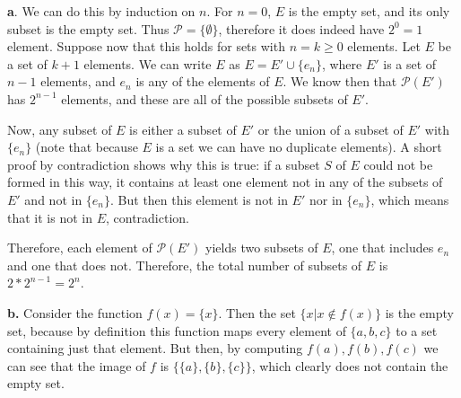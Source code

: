 \begin{solution}

    \textbf{a}. We can do this by induction on $n$. For $n = 0$, $E$ is the empty set, and its only subset is the empty set. Thus $\mathcal{P} = \{\emptyset\}$, therefore it does indeed have $2^0 = 1$ element. Suppose now that this holds for sets with $n = k \geq 0$ elements. Let $E$ be a set of $k+1$ elements. We can write $E$ as $E = E' \cup \{e_n\}$, where $E'$ is a set of $n-1$ elements, and $e_n$ is any of the elements of $E$. We know then that $\mathcal{P}(E')$ has $2^{n-1}$ elements, and these are all of the possible subsets of $E'$. 
    
    Now, any subset of $E$ is either a subset of $E'$ or the union of a subset of $E'$ with $\{e_n\}$ (note that because $E$ is a set we can have no duplicate elements). A short proof by contradiction shows why this is true: if a subset $S$ of $E$ could not be formed in this way, it contains at least one element not in any of the subsets of $E'$ and not in $\{e_n\}$. But then this element is not in $E'$ nor in $\{e_n\}$, which means that it is not in $E$, contradiction.

    Therefore, each element of $\mathcal{P}(E')$ yields two subsets of $E$, one that includes $e_n$ and one that does not. Therefore, the total number of subsets of $E$ is $2*2^{n-1} = 2^n$.

    \textbf{b.} Consider the function $f(x) = \{x\}$. Then the set $\{x\lvert x \notin f(x)\}$ is the empty set, because by definition this function maps every element of $\{a, b, c\}$ to a set containing just that element. But then, by computing $f(a), f(b), f(c)$ we can see that the image of $f$ is $\{\{a\}, \{b\}, \{c\}\}$, which clearly does not contain the empty set.
\end{solution}

